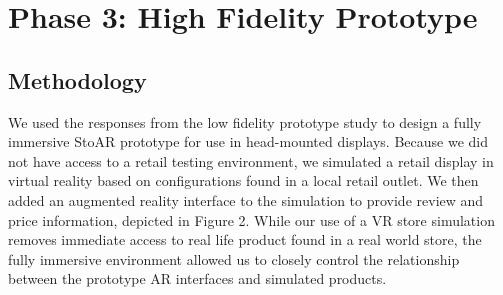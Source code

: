 \section{Phase 3: High Fidelity Prototype}

\subsection{Methodology}
We used the responses from the low fidelity prototype study to design a fully immersive StoAR prototype for use in head-mounted displays. Because we did not have access to a retail testing environment, we simulated a retail display in virtual reality based on configurations found in a local retail outlet. We then added an augmented reality interface to the simulation to provide review and price information, depicted in Figure 2.  While our use of a VR store simulation removes immediate access to real life product found in a real world store, the fully immersive environment allowed us to closely control the relationship between the prototype AR interfaces and simulated products. %


